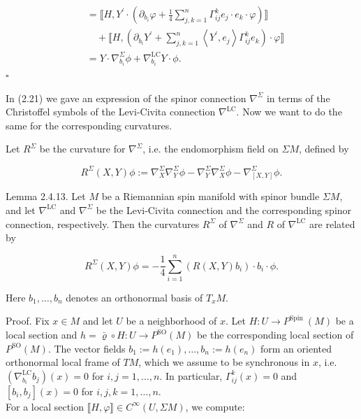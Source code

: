 \documentclass[10pt, letterpaper]{article}
\begin{document}
$$
\begin{aligned}
& =\llbracket H, Y^{\prime} \cdot\left(\partial_{b_{i}} \varphi+\frac{1}{4} \sum_{j, k=1}^{n} \Gamma_{i j}^{k} e_{j} \cdot e_{k} \cdot \varphi\right) \rrbracket \\
& \quad+\llbracket H,\left(\partial_{b_{i}} Y^{\prime}+\sum_{j, k=1}^{n}\left\langle Y^{\prime}, e_{j}\right\rangle \Gamma_{i j}^{k} e_{k}\right) \cdot \varphi \rrbracket \\
& =Y \cdot \nabla_{b_{i}}^{\Sigma} \phi+\nabla_{b_{i}}^{\mathrm{LC}} Y \cdot \phi .
\end{aligned}
$$ \(\square\)

In (2.21) we gave an expression of the spinor connection $\nabla^{\Sigma}$ in terms of the Christoffel symbols of the Levi-Civita connection $\nabla^{\mathrm{LC}}$. Now we want to do the same for the corresponding curvatures.

Let $R^{\Sigma}$ be the curvature for $\nabla^{\Sigma}$, i.e. the endomorphism field on $\Sigma M$, defined by

$$
R^{\Sigma}(X, Y) \phi:=\nabla_{X}^{\Sigma} \nabla_{Y}^{\Sigma} \phi-\nabla_{Y}^{\Sigma} \nabla_{X}^{\Sigma} \phi-\nabla_{[X, Y]}^{\Sigma} \phi .
$$

Lemma 2.4.13. Let $M$ be a Riemannian spin manifold with spinor bundle $\Sigma M$, and let $\nabla^{\mathrm{LC}}$ and $\nabla^{\Sigma}$ be the Levi-Civita connection and the corresponding spinor connection, respectively. Then the curvatures $R^{\Sigma}$ of $\nabla^{\Sigma}$ and $R$ of $\nabla^{\mathrm{LC}}$ are related by

$$
R^{\Sigma}(X, Y) \phi=-\frac{1}{4} \sum_{i=1}^{n}\left(R(X, Y) b_{i}\right) \cdot b_{i} \cdot \phi .
$$

Here $b_{1}, \ldots, b_{n}$ denotes an orthonormal basis of $T_{x} M$.

Proof. Fix $x \in M$ and let $U$ be a neighborhood of $x$. Let $H: U \rightarrow P^{\text {Spin }}(M)$ be a local section and $h=\bar{\varrho} \circ H: U \rightarrow P^{\mathrm{SO}}(M)$ be the corresponding local section of $P^{\mathrm{SO}}(M)$. The vector fields $b_{1}:=h\left(e_{1}\right), \ldots, b_{n}:=h\left(e_{n}\right)$ form an oriented orthonormal local frame of $T M$, which we assume to be synchronous in $x$, i.e. $\left(\nabla_{b_{i}}^{\mathrm{LC}} b_{j}\right)(x)=0$ for $i, j=1, \ldots, n$. In particular, $\Gamma_{i j}^{k}(x)=0$ and $\left[b_{i}, b_{j}\right](x)=0$ for $i, j, k=1, \ldots, n$.\\
For a local section $\llbracket H, \varphi \rrbracket \in C^{\infty}(U, \Sigma M)$, we compute:
\end{document}
